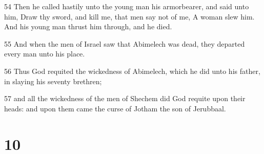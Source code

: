 \par 54 Then he called hastily unto the young man his armorbearer, and said unto him, Draw thy sword, and kill me, that men say not of me, A woman slew him. And his young man thrust him through, and he died.
\par 55 And when the men of Israel saw that Abimelech was dead, they departed every man unto his place.
\par 56 Thus God requited the wickedness of Abimelech, which he did unto his father, in slaying his seventy brethren;
\par 57 and all the wickedness of the men of Shechem did God requite upon their heads: and upon them came the curse of Jotham the son of Jerubbaal.

\chapter{10}


